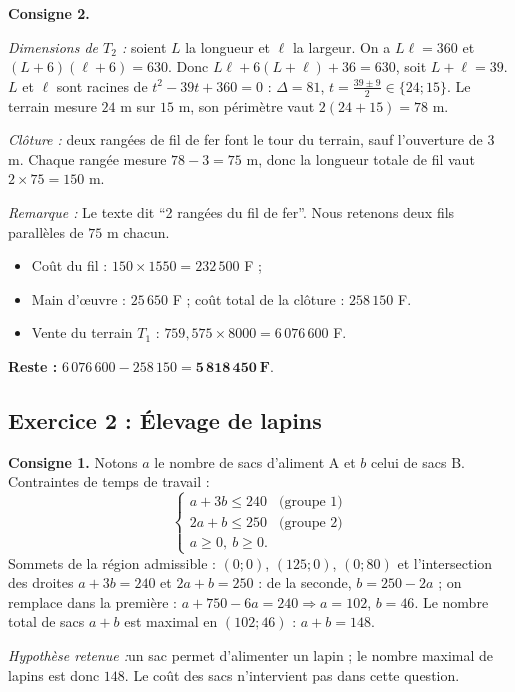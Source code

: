 \documentclass[11pt,a4paper]{article}
\newenvironment{rem}{\par\medskip\noindent\textit{Remarque :}\quad}{\par\medskip}
\newenvironment{hyp}{\par\medskip\noindent\textit{Hypoth\`ese retenue :}\quad}{\par\medskip}
\begin{document}
\medskip\noindent\textbf{Consigne 2.}

\emph{Dimensions de $T_2$ :} soient $L$ la longueur et $\ell$ la largeur. On a $L\ell=360$ et
$(L+6)(\ell+6)=630$. Donc $L\ell+6(L+\ell)+36=630$, soit $L+\ell=39$.
$L$ et $\ell$ sont racines de $t^2-39t+360=0$ : $\Delta=81$, $t=\frac{39\pm 9}{2}\in\{24;15\}$.
Le terrain mesure $24$ m sur $15$ m, son p\'erim\`etre vaut $2(24+15)=78$ m.

\emph{Cl\^oture :} deux rang\'ees de fil de fer font le tour du terrain, sauf l'ouverture de 3 m.
Chaque rang\'ee mesure $78-3=75$ m, donc la longueur totale de fil vaut $2\times 75=150$ m.
\begin{rem}
Le texte dit ``2 rang\'ees du fil de fer''. Nous retenons deux fils parall\`eles de $75$ m chacun.
\end{rem}

\begin{itemize}
  \item Co\^ut du fil : $150\times 1550=232\,500$ F ;
  \item Main d'\oe uvre : $25\,650$ F ; co\^ut total de la cl\^oture : $258\,150$ F.
  \item Vente du terrain $T_1$ : $759{,}575\times 8000=6\,076\,600$ F.
\end{itemize}
\textbf{Reste :} $6\,076\,600-258\,150=\mathbf{5\,818\,450\ F}$.

\subsection{Exercice 2 : \'Elevage de lapins}

\textbf{Consigne 1.} Notons $a$ le nombre de sacs d'aliment A et $b$ celui de sacs B.
Contraintes de temps de travail :
\[
\begin{cases}
a+3b\le 240 & \text{(groupe 1)}\\
2a+b\le 250 & \text{(groupe 2)}\\
a\ge 0,\ b\ge 0.
\end{cases}
\]
Sommets de la r\'egion admissible : $(0;0)$, $(125;0)$, $(0;80)$ et l'intersection des droites
$a+3b=240$ et $2a+b=250$ : de la seconde, $b=250-2a$ ; on remplace dans la premi\`ere :
$a+750-6a=240\Rightarrow a=102$, $b=46$.
Le nombre total de sacs $a+b$ est maximal en $(102;46)$ : $a+b=148$.
\begin{hyp}un sac permet d'alimenter un lapin ; le nombre maximal de lapins est donc $148$.
Le co\^ut des sacs n'intervient pas dans cette question.\end{hyp}
\end{document}
